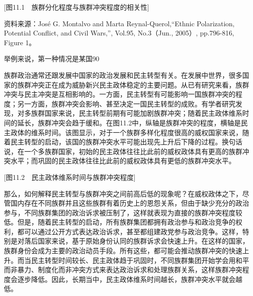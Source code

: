 [图11.1　族群分化程度与族群冲突程度的相关性]

资料来源：José G. Montalvo and Marta Reynal-Querol,“Ethnic Polarization, Potential Conflict, and Civil Wars,”, Vol.95, No.3（Jun., 2005）, pp.796-816, Figure 1。

举例来说，第一种情况是某国90%

族群政治通常还跟发展中国家的政治发展和民主转型有关。在发展中世界，很多国家的族群冲突正在成为威胁新兴民主政体稳定的主要问题。从已有研究来看，族群冲突与民主冲突是互相影响的。一方面，民主转型有可能影响一国族群冲突的程度；另一方面，族群冲突会影响、甚至决定一国民主转型的成败。有学者研究发现，对多族群国家来说，民主转型前期有可能加剧族群冲突；随着民主政体维系时间的延长，族群冲突会趋于缓和。在图11.2中，纵轴是族群冲突的程度，横轴是民主政体的维系时间。该图显示，对于一个族群多样化程度很高的威权国家来说，随着民主转型的启动，该国的族群冲突水平可能出现先上升后下降的过程。换句话说，在一个多族群国家，初始的民主政体往往比此前的威权政体具有更高的族群冲突水平；而巩固的民主政体往往比此前的威权政体具有更低的族群冲突水平。

[图11.2　民主政体维系时间与族群冲突程度]

那么，如何解释民主转型与族群冲突之间前高后低的现象呢？在威权政体之下，尽管国内存在不同族群并且这些族群有着历史上的恩怨关系，但由于缺少充分的政治参与，不同族群集团的政治诉求被压制了，这样就表现为直接的族群冲突程度较低。但是，随着民主转型的启动，所有族群集团都拥有政治参与和政治竞争的权利，都可以通过公开方式表达政治诉求，甚至都组建政党参与政治竞争。这样，特别是对落后国家来说，基于原始身份认同的族群诉求会快速上升。在这样的国家，族群身份会成为主要的政治动员手段。所有这些，都可能会推动族群冲突的快速上升。而当民主转型时间较长、民主政体趋于巩固时，不同族群集团开始学会用和平而非暴力、制度化而非冲突方式来表达政治诉求和处理族群关系，这样族群冲突程度会逐步降低。因此，长期当中，民主政体维系时间越长，族群冲突水平就会越低。

